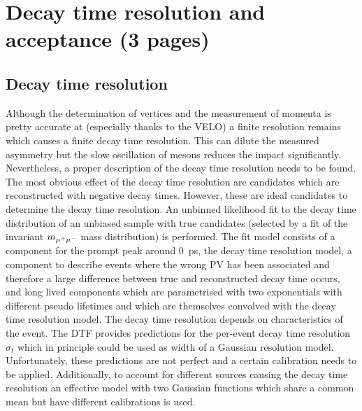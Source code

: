\newpage
\section{Decay time resolution and acceptance (3 pages)}
\label{sec:bd2jpsiks:decaytime}

\subsection{Decay time resolution}
\label{sec:bd2jpsiks:decaytime:resolution}

Although the determination of vertices and the measurement of momenta is
pretty accurate at \lhcb (especially thanks to the VELO) a finite resolution
remains which causes a finite decay time resolution. This can dilute the
measured \CP asymmetry but the slow oscillation of \Bd mesons reduces the
impact significantly. Nevertheless, a proper description of the decay time
resolution needs to be found. The most obvious effect of the decay time
resolution are candidates which are reconstructed with negative decay times.
However, these are ideal candidates to determine the decay time resolution. An
unbinned likelihood fit to the decay time distribution of an unbiased
\BdToJPsiKS sample with true \jpsi candidates (selected by a fit of the
invariant $m_{{\mu^+\mu^-}}$ mass distribution) is performed. The fit model consists
of a component for the prompt peak around \SI{0}{\ps}, \ie the decay time
resolution model, a component to describe events where the wrong PV has been
associated and therefore a large difference between true and reconstructed
decay time occurs, and long lived components which are parametrised with two
exponentials with different pseudo lifetimes and which are themselves
convolved with the decay time resolution model. The decay time resolution
depends on characteristics of the event. The DTF provides predictions for the
per-event decay time resolution $\sigma_t$ which in principle could be used as
width of a Gaussian resolution model. Unfortunately, these predictions are not
perfect and a certain calibration needs to be applied. Additionally, to
account for different sources causing the decay time resolution an effective
model with two Gaussian functions which share a common mean but have different
calibrations is used.

